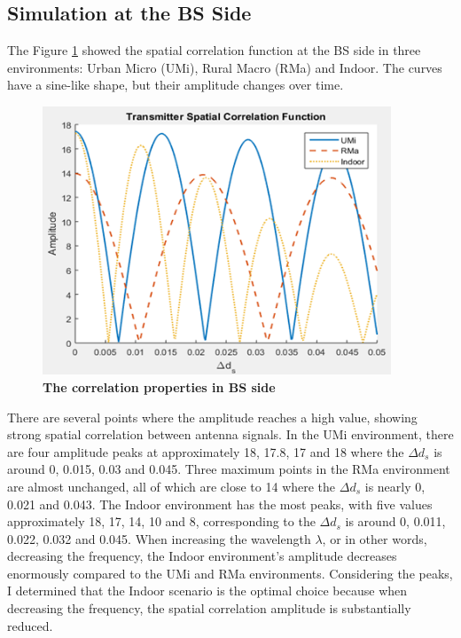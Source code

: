 \documentclass{article} %
\begin{document}
\subsection{Simulation at the BS Side}

The Figure \ref{figure2} showed the spatial correlation function at the BS side in three environments: Urban Micro (UMi), Rural Macro (RMa) and Indoor. The curves have a sine-like shape, but their amplitude changes over time.

\begin{figure}[!ht]
    \centering
    \includegraphics[height=8cm]{Images/figure2.png}
    \caption[The correlation properties in BS side~\cite{final_exam}]{\bfseries \fontsize{12pt}{0pt}\selectfont The correlation properties in BS side~\cite{final_exam}}
    \label{figure2}
\end{figure}

There are several points where the amplitude reaches a high value, showing strong spatial correlation between antenna signals. In the UMi environment, there are four amplitude peaks at approximately 18, 17.8, 17 and 18 where the $\Delta d_s$ is around 0, 0.015, 0.03 and 0.045. Three maximum points in the RMa environment are almost unchanged, all of which are close to 14 where the $\Delta d_s$ is nearly 0, 0.021 and 0.043. The Indoor environment has the most peaks, with five values approximately 18, 17, 14, 10 and 8, corresponding to the $\Delta d_s$ is around 0, 0.011, 0.022, 0.032 and 0.045. When increasing the wavelength $\lambda$, or in other words, decreasing the frequency, the Indoor environment’s amplitude decreases enormously compared to the UMi and RMa environments. Considering the peaks, I determined that the Indoor scenario is the optimal choice because when decreasing the frequency, the spatial correlation amplitude is substantially reduced.
\end{document}
